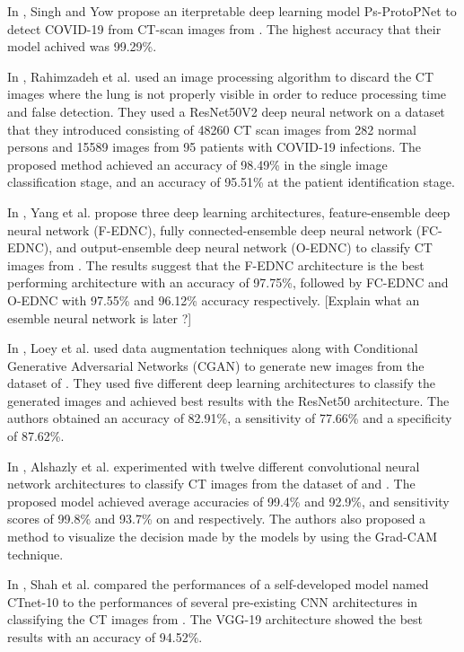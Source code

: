\documentclass[12pt, letterpaper]{article}
\begin{document}
In \cite{Singh_2021}, Singh and Yow propose an iterpretable deep learning model Ps-ProtoPNet to detect COVID-19 from CT-scan images from \cite{Gunraj_2021}. The highest accuracy that their model achived was 99.29\%.

In \cite{Rahimzadeh_2021}, Rahimzadeh et al. used an image processing algorithm to discard the CT images where the lung is not properly visible in order to reduce processing time and false detection. They used a ResNet50V2 deep neural network on a dataset that they introduced consisting of 48260 CT scan images from 282 normal persons and 15589 images from 95 patients with COVID-19 infections. The proposed method achieved an accuracy of 98.49\% in the single image classification stage, and an accuracy of 95.51\% at the patient identification stage. 

In \cite{Yang_2022}, Yang et al. propose three deep learning architectures, feature-ensemble deep neural network (F-EDNC), fully connected-ensemble deep neural network (FC-EDNC), and output-ensemble deep neural network (O-EDNC) to classify CT images from \cite{Angelov_2020}. The results suggest that the F-EDNC architecture is the best performing architecture with an accuracy of 97.75\%, followed by FC-EDNC and O-EDNC with 97.55\% and 96.12\% accuracy respectively. [Explain what an esemble neural network is later ?]

In \cite{Loey_2020}, Loey et al. used data augmentation techniques along with Conditional Generative Adversarial Networks (CGAN) to generate new images from the dataset of \cite{Zhao_2020}. They used five different deep learning architectures to classify the generated images and achieved best results with the ResNet50 architecture. The authors obtained an accuracy of 82.91\%, a sensitivity of 77.66\% and a specificity of 87.62\%.

In \cite{Alshazly_2020}, Alshazly et al. experimented with twelve different convolutional neural network architectures to classify CT images from the dataset of \cite{Angelov_2020} and \cite{Zhao_2020}. The proposed model achieved average accuracies of 99.4\% and 92.9\%, and sensitivity scores of 99.8\% and 93.7\% on \cite{Angelov_2020} and \cite{Zhao_2020} respectively. The authors also proposed a method to visualize the decision made by the models by using the Grad-CAM technique.

In \cite{Shah_2021}, Shah et al. compared the performances of a self-developed model named CTnet-10 to the performances of several pre-existing CNN architectures in classifying the CT images from \cite{Zhao_2020}. The VGG-19 architecture showed the best results with an accuracy of 94.52\%.
\end{document}
